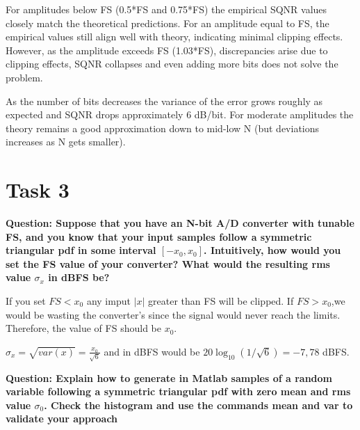 \documentclass[11pt,a4paper]{article}
\begin{document}
For amplitudes below FS (0.5*FS and 0.75*FS) the empirical SQNR values closely match the theoretical predictions.
For an amplitude equal to FS, the empirical values still align well with theory, indicating minimal clipping effects.
However, as the amplitude exceeds FS (1.03*FS), discrepancies arise due to clipping effects, SQNR collapses and even adding more bits does not solve the problem.

As the number of bits decreases the variance of the error grows roughly as expected and SQNR drops approximately 6 dB/bit.
For moderate amplitudes the theory remains a good approximation down to mid-low N (but deviations increases as N gets smaller).

\section{Task 3}
\textbf{Question: Suppose that you have an N-bit A/D converter with tunable FS, and you know that your input samples follow
    a symmetric triangular pdf in some interval $[-x_0,x_0]$. Intuitively, how would you set the FS value of your converter?
    What would the resulting rms value $\sigma_x$ in dBFS be?
}

\vspace{0.5cm}
If you set $FS < x_0$ any imput $|x|$ greater than FS will be clipped. If $FS > x_0$,we would be wasting the converter's since the signal would never
reach the limits. Therefore, the value of FS should be $x_0$.

$\sigma_x = \sqrt{var(x)} = \frac{x_0}{\sqrt{6}}$ and in dBFS would be $20\log_{10}(1/\sqrt{6}) = -7,78$ dBFS.

\vspace{1cm}
\textbf{Question: Explain how to generate in Matlab samples of a random variable following a symmetric triangular pdf with
    zero mean and rms value $\sigma_0$. Check the histogram and use the commands mean and var to validate your approach
}
\end{document}

